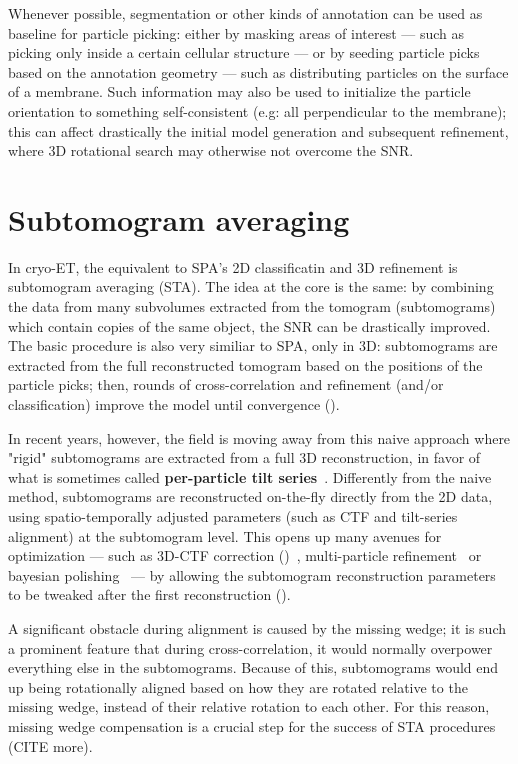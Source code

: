 Whenever possible, segmentation or other kinds of annotation can be used as baseline for particle picking: either by masking areas of interest --- such as picking only inside a certain cellular structure --- or by seeding particle picks based on the annotation geometry --- such as distributing particles on the surface of a membrane.
Such information may also be used to initialize the particle orientation to something self-consistent (e.g: all perpendicular to the membrane); this can affect drastically the initial model generation and subsequent refinement, where 3D rotational search may otherwise not overcome the SNR.

\section{Subtomogram averaging}\label{et_sta}
In cryo-ET, the equivalent to SPA's 2D classificatin and 3D refinement is subtomogram averaging (STA).
The idea at the core is the same: by combining the data from many subvolumes extracted from the tomogram (subtomograms) which contain copies of the same object, the SNR can be drastically improved.
The basic procedure is also very similiar to SPA, only in 3D: subtomograms are extracted from the full reconstructed tomogram based on the positions of the particle picks; then, rounds of cross-correlation and refinement (and/or classification) improve the model until convergence ().

In recent years, however, the field is moving away from this naive approach where "rigid" subtomograms are extracted from a full 3D reconstruction, in favor of what is sometimes called \textbf{per-particle tilt series}~\cite{himesEmClaritySoftwareHighresolution2018,zivanovBayesianApproachSingleparticle2022,tegunovRealtimeCryoelectronMicroscopy2019,chenCompleteDataProcessing2019}.
Differently from the naive method, subtomograms are reconstructed on-the-fly directly from the 2D data, using spatio-temporally adjusted parameters (such as CTF and tilt-series alignment) at the subtomogram level.
This opens up many avenues for optimization --- such as 3D-CTF correction ()~\cite{turonovaEfficient3DCTFCorrection2017}, multi-particle refinement~\cite{tegunovMultiparticleCryoEMRefinement2021} or bayesian polishing~\cite{zivanovBayesianApproachSingleparticle2022} --- by allowing the subtomogram reconstruction parameters to be tweaked after the first reconstruction ().

A significant obstacle during alignment is caused by the missing wedge; it is such a prominent feature that during cross-correlation, it would normally overpower everything else in the subtomograms.
Because of this, subtomograms would end up being rotationally aligned based on how they are rotated relative to the missing wedge, instead of their relative rotation to each other.
For this reason, missing wedge compensation is a crucial step for the success of STA procedures~\cite{galaz-montoyaAlignmentAlgorithmsPerparticle2016} (CITE more).

